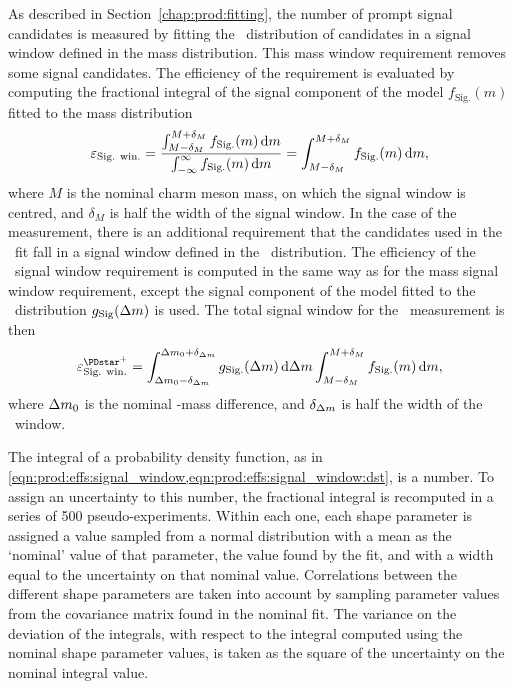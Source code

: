As described in Section~\ref{chap:prod:fitting}, the number of prompt signal 
candidates is measured by fitting the \lnipchisq\ distribution of candidates in 
a signal window defined in the mass distribution.
This mass window requirement removes some signal candidates.
The efficiency of the requirement is evaluated by computing the fractional 
integral of the signal component of the model $f_{\text{Sig.}}(m)$ fitted to 
the mass distribution
\begin{equation}
  \effsigwin = \frac{%
    \int_{M - \delta_{M}}^{M +\delta_{M}} f_{\text{Sig.}}(m) \dif{m}
  }{%
    \int_{-\infty}^{\infty} f_{\text{Sig.}}(m) \dif{m}
  }
  = \int_{M - \delta_{M}}^{M +\delta_{M}} f_{\text{Sig.}}(m) \dif{m},
    \label{eqn:prod:effs:signal_window}
\end{equation}
where $M$ is the nominal charm meson mass, on which the signal window is 
centred, and $\delta_{M}$ is half the width of the signal window.
In the case of the \PDstarp measurement, there is an additional requirement 
that the candidates used in the \lnipchisq\ fit fall in a signal window defined 
in the \deltam\ distribution.
The efficiency of the \deltam\ signal window requirement is computed in the 
same way as for the mass signal window requirement, except the signal component 
of the model fitted to the \deltam\ distribution $g_{\text{Sig}}(\Delta{m})$ is 
used.
The total signal window for the \PDstarp\ measurement is then
\begin{equation}
  \effsigwin^{\PDstarp} =
    \int_{\deltam_{0} - \delta_{\deltam}}^{\deltam_{0} +\delta_{\deltam}} g_{\text{Sig.}}(\deltam) \dif{\deltam}
    \int_{M - \delta_{M}}^{M +\delta_{M}} f_{\text{Sig.}}(m) \dif{m},
    \label{eqn:prod:effs:signal_window:dst}
\end{equation}
where $\Delta{m}_{0}$ is the nominal \PDstarp-\PDzero mass difference, and $\delta_{\Delta{m}}$ is half the width of the \deltam\ window.

The integral of a probability density function, as in \cref{eqn:prod:effs:signal_window,eqn:prod:effs:signal_window:dst}, is a number.
To assign an uncertainty to this number, the fractional integral is recomputed 
in a series of 500 pseudo-experiments.
Within each one, each shape parameter is assigned a value sampled from a 
normal distribution with a mean as the `nominal' value of that parameter, the 
value found by the fit, and with a width equal to the uncertainty on that 
nominal value. Correlations between the different shape parameters are taken 
into account by sampling parameter values from the covariance matrix found in 
the nominal fit.
The variance on the deviation of the integrals, with respect to the integral 
computed using the nominal shape parameter values, is taken as the square of 
the uncertainty on the nominal integral value.

